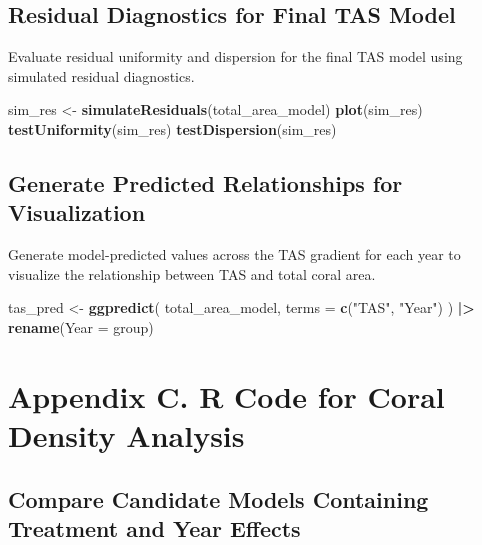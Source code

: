 \documentclass[
]{article}
\newenvironment{Shaded}{\begin{snugshade}}{\end{snugshade}}
\newcommand{\AttributeTok}[1]{\textcolor[rgb]{0.13,0.29,0.53}{#1}}
\newcommand{\FunctionTok}[1]{\textcolor[rgb]{0.13,0.29,0.53}{\textbf{#1}}}
\newcommand{\NormalTok}[1]{#1}
\newcommand{\OtherTok}[1]{\textcolor[rgb]{0.56,0.35,0.01}{#1}}
\newcommand{\SpecialCharTok}[1]{\textcolor[rgb]{0.81,0.36,0.00}{\textbf{#1}}}
\newcommand{\StringTok}[1]{\textcolor[rgb]{0.31,0.60,0.02}{#1}}
\begin{document}
\subsection{Residual Diagnostics for Final TAS
Model}\label{residual-diagnostics-for-final-tas-model}

Evaluate residual uniformity and dispersion for the final TAS model
using simulated residual diagnostics.

\begin{Shaded}
\begin{Highlighting}[]
\NormalTok{sim\_res }\OtherTok{\textless{}{-}} \FunctionTok{simulateResiduals}\NormalTok{(total\_area\_model)}
\FunctionTok{plot}\NormalTok{(sim\_res)}
\FunctionTok{testUniformity}\NormalTok{(sim\_res)}
\FunctionTok{testDispersion}\NormalTok{(sim\_res)}
\end{Highlighting}
\end{Shaded}

\subsection{Generate Predicted Relationships for
Visualization}\label{generate-predicted-relationships-for-visualization}

Generate model-predicted values across the TAS gradient for each year to
visualize the relationship between TAS and total coral area.

\begin{Shaded}
\begin{Highlighting}[]
\NormalTok{tas\_pred }\OtherTok{\textless{}{-}} \FunctionTok{ggpredict}\NormalTok{(}
\NormalTok{  total\_area\_model,}
  \AttributeTok{terms =} \FunctionTok{c}\NormalTok{(}\StringTok{"TAS"}\NormalTok{, }\StringTok{"Year"}\NormalTok{)}
\NormalTok{) }\SpecialCharTok{|\textgreater{}}
  \FunctionTok{rename}\NormalTok{(}\AttributeTok{Year =}\NormalTok{ group)}
\end{Highlighting}
\end{Shaded}

\section{Appendix C. R Code for Coral Density
Analysis}\label{appendix-c.-r-code-for-coral-density-analysis}

\subsection{Compare Candidate Models Containing Treatment and Year
Effects}\label{compare-candidate-models-containing-treatment-and-year-effects-1}
\end{document}

